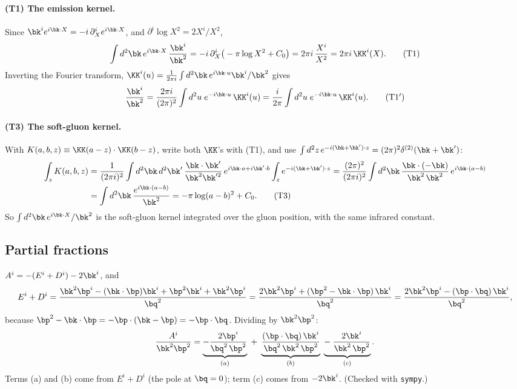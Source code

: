 \paragraph{(T1) The emission kernel.} Since $\bk^ie^{i\bk\cdot X}=-i\,\partial^i_Xe^{i\bk\cdot X}$, and $\partial^i\log X^2=2X^i/X^2$,
\begin{equation}
\int d^2\bk\,e^{i\bk\cdot X}\,\frac{\bk^i}{\bk^2}=-i\,\partial^i_X\big(-\pi\log X^2+C_0\big)=2\pi i\,\frac{X^i}{X^2}=2\pi i\,\KK^i(X).
\tag{T1}
\end{equation}
Inverting the Fourier transform, $\KK^i(u)=\frac{1}{2\pi i}\int d^2\bk\,e^{i\bk\cdot u}\bk^i/\bk^2$ gives
\begin{equation}
\frac{\bk^i}{\bk^2}=\frac{2\pi i}{(2\pi)^2}\int d^2u\;e^{-i\bk\cdot u}\,\KK^i(u)=\frac{i}{2\pi}\int d^2u\;e^{-i\bk\cdot u}\,\KK^i(u).
\tag{T1$'$}
\end{equation}
\paragraph{(T3) The soft-gluon kernel.} With $K(a,b,z)\equiv\KK(a-z)\cdot\KK(b-z)$, write both $\KK$'s with (T1), and use $\int d^2z\,e^{-i(\bk+\bk')\cdot z}=(2\pi)^2\delta^{(2)}(\bk+\bk')$:
\begin{align}
\int_zK(a,b,z)&=\frac{1}{(2\pi i)^2}\int d^2\bk\,d^2\bk'\,\frac{\bk\cdot\bk'}{\bk^2\bk'^2}\,e^{i\bk\cdot a+i\bk'\cdot b}\int_ze^{-i(\bk+\bk')\cdot z}
=\frac{(2\pi)^2}{(2\pi i)^2}\int d^2\bk\,\frac{\bk\cdot(-\bk)}{\bk^2\,\bk^2}\,e^{i\bk\cdot(a-b)}\notag\\
&=\int d^2\bk\,\frac{e^{i\bk\cdot(a-b)}}{\bk^2}=-\pi\log(a-b)^2+C_0 .
\tag{T3}
\end{align}
So $\int d^2\bk\,e^{i\bk\cdot X}/\bk^2$ is the soft-gluon kernel integrated over the gluon position, with the same infrared constant.

\subsection{Partial fractions}\label{sec:ft-pf}
$A^i=-(E^i+D^i)-2\bk^i$, and
\begin{equation}
E^i+D^i=\frac{\bk^2\bp^i-(\bk\cdot\bp)\bk^i+\bp^2\bk^i+\bk^2\bp^i}{\bq^2}=\frac{2\bk^2\bp^i+(\bp^2-\bk\cdot\bp)\,\bk^i}{\bq^2}=\frac{2\bk^2\bp^i-(\bp\cdot\bq)\,\bk^i}{\bq^2},
\end{equation}
because $\bp^2-\bk\cdot\bp=-\bp\cdot(\bk-\bp)=-\bp\cdot\bq$. Dividing by $\bk^2\bp^2$:
\begin{equation}
\frac{A^i}{\bk^2\bp^2}=\underbrace{-\frac{2\bp^i}{\bq^2\,\bp^2}}_{(a)}\;+\;\underbrace{\frac{(\bp\cdot\bq)\,\bk^i}{\bq^2\,\bk^2\,\bp^2}}_{(b)}\;\underbrace{-\;\frac{2\bk^i}{\bk^2\,\bp^2}}_{(c)} .
\label{eq:pf}
\end{equation}
Terms (a) and (b) come from $E^i+D^i$ (the pole at $\bq=0$); term (c) comes from $-2\bk^i$. (Checked with \texttt{sympy}.)

